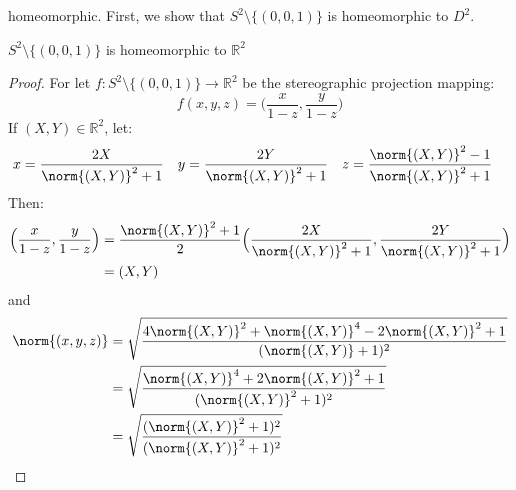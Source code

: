 \documentclass[crop=false,class=book,oneside]{standalone}
\begin{document}
            homeomorphic. First, we show that
            $S^{2}\setminus\{(0,0,1)\}$ is homeomorphic to $D^{2}$.
            \begin{theorem}
                \label{theorem:surgery_theory_the_sphere_with_a_%
                       point_removed_is_homeomorphic_to_the_plane}
                $S^{2}\setminus\{(0,0,1)\}$ is homeomorphic to $\mathbb{R}^{2}$
            \end{theorem}
            \begin{proof}
                For let
                $f:S^{2}\setminus\{(0,0,1)\}%
                 \rightarrow \mathbb{R}^{2}$
                be the stereographic projection mapping:
                \begin{equation}
                    f(x,y,z)=\Big(\frac{x}{1-z},\frac{y}{1-z}\Big)
                \end{equation}
                If $(X,Y)\in\mathbb{R}^{2}$, let:
                \begin{align*}
                    x&=\frac{2X}{\norm{(X,Y)}^{2}+1}&
                    y&=\frac{2Y}{\norm{(X,Y)}^{2}+1}&
                    z&=\frac{\norm{(X,Y)}^{2}-1}{\norm{(X,Y)}^{2}+1} 
                \end{align*}
                Then:
                \begin{subequations}
                    \begin{align}
                        \Big(\frac{x}{1-z},\frac{y}{1-z}\Big)
                        &=\frac{\norm{(X,Y)}^{2}+1}{2}
                        \Big(\frac{2X}{\norm{(X,Y)}^{2}+ 1},
                             \frac{2Y}{\norm{(X,Y)}^{2}+1}\Big)\\
                        &=(X,Y)
                    \end{align}
                \end{subequations}
                and
                \begin{subequations}
                    \begin{align}
                        \norm{(x,y,z)}
                        &=\sqrt{\frac{4\norm{(X,Y)}^{2}
                                      +\norm{(X,Y)}^{4}
                                      -2\norm{(X,Y)}^{2}+1}{(\norm{(X,Y)}+1)^{2}}}\\
                        &=\sqrt{\frac{\norm{(X,Y)}^{4}+2\norm{(X,Y)}^{2}+1}
                                {(\norm{(X,Y)}^{2}+1)^{2}}}\\
                        &=\sqrt{\frac{(\norm{(X,Y)}^{2}+1)^{2}}{(\norm{(X,Y)}^{2}+1)^{2}}}

\end{align}
\end{subequations}
\end{proof}
\end{document}
